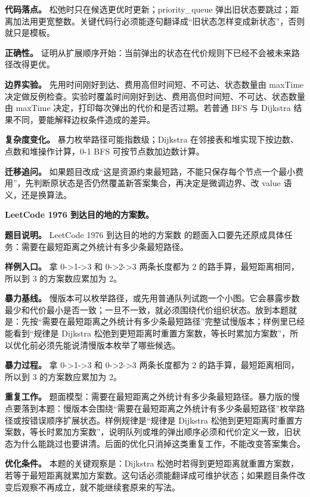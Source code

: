 \textbf{代码落点。} 松弛时只在候选更优时更新；priority\_queue 弹出旧状态要跳过；距离加法用更宽整数。关键代码行必须能逐句翻译成“旧状态怎样变成新状态”，否则就只是模板。

\textbf{正确性。} 证明从扩展顺序开始：当前弹出的状态在代价规则下已经不会被未来路径改得更优。

\textbf{边界实验。} 先用时间刚好到达、费用高但时间短、不可达、状态数量由 maxTime 决定做反例检查。实验时覆盖时间刚好到达、费用高但时间短、不可达、状态数量由 maxTime 决定，打印每次弹出的代价和是否过期。若普通 BFS 与 Dijkstra 结果不同，要能解释边权条件造成的差异。

\textbf{复杂度变化。} 暴力枚举路径可能指数级；Dijkstra 在邻接表和堆实现下按边数、点数和堆操作计算，0-1 BFS 可按节点数加边数计算。

\textbf{迁移追问。} 如果题目改成“这是资源约束最短路，不能只保存每个节点一个最小费用”，先判断原状态是否仍然覆盖新答案集合，再决定是微调边界、改 value 语义，还是换算法。

\noindent\textbf{LeetCode 1976 到达目的地的方案数。}

\textbf{题目说明。} LeetCode 1976 到达目的地的方案数 的题面入口要先还原成具体任务：需要在最短距离之外统计有多少条最短路径。

\textbf{样例入口。} 拿 0->1->3 和 0->2->3 两条长度都为 2 的路手算，最短距离相同，所以到 3 的方案数应累加为 2。

\textbf{暴力基线。} 慢版本可以枚举路径，或先用普通队列试跑一个小图。它会暴露步数最少和代价最小是否一致；一旦不一致，就必须围绕代价组织状态。放到本题就是：先按“需要在最短距离之外统计有多少条最短路径”完整试慢版本；样例里已经能看到“规律是 Dijkstra 松弛到更短距离时重置方案数，等长时累加方案数”，所以优化前必须先能说清慢版本枚举了哪些候选。

\textbf{暴力过程。} 拿 0->1->3 和 0->2->3 两条长度都为 2 的路手算，最短距离相同，所以到 3 的方案数应累加为 2。

\textbf{重复工作。} 题面模型：需要在最短距离之外统计有多少条最短路径。暴力版的慢点要落到本题：慢版本会围绕“需要在最短距离之外统计有多少条最短路径”枚举路径或按错误顺序扩展状态。样例规律是“规律是 Dijkstra 松弛到更短距离时重置方案数，等长时累加方案数”，说明队列或堆的弹出顺序必须和代价定义一致，旧状态为什么能跳过也要讲清。后面的优化只消掉这类重复工作，不能改变答案集合。

\textbf{优化条件。} 本题的关键观察是：Dijkstra 松弛时若得到更短距离就重置方案数，若等于最短距离就累加方案数。这句话必须能翻译成可维护状态；如果题目条件改变后观察不再成立，就不能继续套原来的写法。

